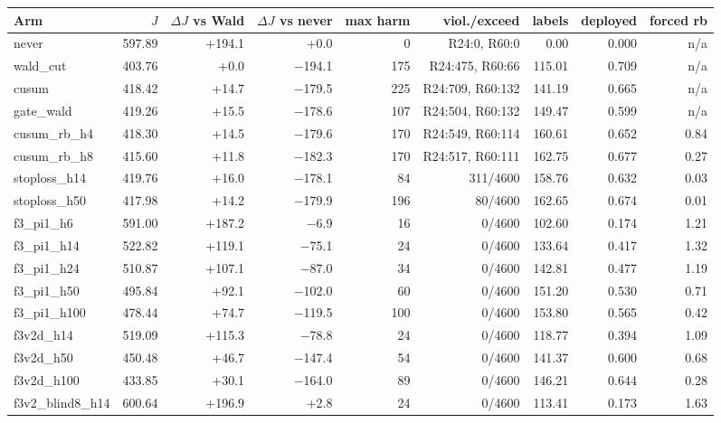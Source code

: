 \begin{tabular}{@{}l r r r r r r r r@{}}
\toprule
Arm & $J$ & $\Delta J$ vs Wald & $\Delta J$ vs never & max harm & viol./exceed & labels & deployed & forced rb \\
\midrule
never & 597.89 & +194.1 & +0.0 & 0 & R24:0, R60:0 & 0.00 & 0.000 & n/a \\
wald\_cut & 403.76 & +0.0 & $-$194.1 & 175 & R24:475, R60:66 & 115.01 & 0.709 & n/a \\
cusum & 418.42 & +14.7 & $-$179.5 & 225 & R24:709, R60:132 & 141.19 & 0.665 & n/a \\
gate\_wald & 419.26 & +15.5 & $-$178.6 & 107 & R24:504, R60:132 & 149.47 & 0.599 & n/a \\
cusum\_rb\_h4 & 418.30 & +14.5 & $-$179.6 & 170 & R24:549, R60:114 & 160.61 & 0.652 & 0.84 \\
cusum\_rb\_h8 & 415.60 & +11.8 & $-$182.3 & 170 & R24:517, R60:111 & 162.75 & 0.677 & 0.27 \\
stoploss\_h14 & 419.76 & +16.0 & $-$178.1 & 84 & 311/4600 & 158.76 & 0.632 & 0.03 \\
stoploss\_h50 & 417.98 & +14.2 & $-$179.9 & 196 & 80/4600 & 162.65 & 0.674 & 0.01 \\
f3\_pi1\_h6 & 591.00 & +187.2 & $-$6.9 & 16 & 0/4600 & 102.60 & 0.174 & 1.21 \\
f3\_pi1\_h14 & 522.82 & +119.1 & $-$75.1 & 24 & 0/4600 & 133.64 & 0.417 & 1.32 \\
f3\_pi1\_h24 & 510.87 & +107.1 & $-$87.0 & 34 & 0/4600 & 142.81 & 0.477 & 1.19 \\
f3\_pi1\_h50 & 495.84 & +92.1 & $-$102.0 & 60 & 0/4600 & 151.20 & 0.530 & 0.71 \\
f3\_pi1\_h100 & 478.44 & +74.7 & $-$119.5 & 100 & 0/4600 & 153.80 & 0.565 & 0.42 \\
f3v2d\_h14 & 519.09 & +115.3 & $-$78.8 & 24 & 0/4600 & 118.77 & 0.394 & 1.09 \\
f3v2d\_h50 & 450.48 & +46.7 & $-$147.4 & 54 & 0/4600 & 141.37 & 0.600 & 0.68 \\
f3v2d\_h100 & 433.85 & +30.1 & $-$164.0 & 89 & 0/4600 & 146.21 & 0.644 & 0.28 \\
f3v2\_blind8\_h14 & 600.64 & +196.9 & +2.8 & 24 & 0/4600 & 113.41 & 0.173 & 1.63 \\
\bottomrule
\end{tabular}
